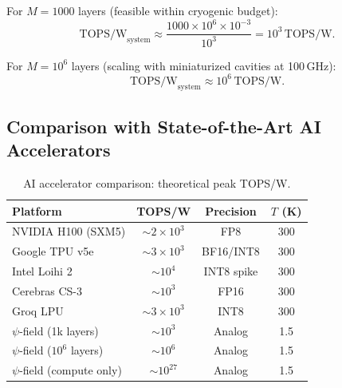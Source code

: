 \documentclass[11pt,twocolumn]{article}
\theoremstyle{definition}
\theoremstyle{remark}
\begin{document}
For $M = 1000$ layers (feasible within cryogenic budget):
\begin{equation}
\mathrm{TOPS/W}_{\mathrm{system}} \approx \frac{1000 \times 10^6 \times 10^{-3}}{10^3}
= 10^3\,\mathrm{TOPS/W}.
\end{equation}

For $M = 10^6$ layers (scaling with miniaturized cavities at 100\,GHz):
\begin{equation}
\mathrm{TOPS/W}_{\mathrm{system}} \approx 10^6\,\mathrm{TOPS/W}.
\end{equation}

\subsection{Comparison with State-of-the-Art AI Accelerators}
\label{sec:ai_comparison}

\begin{table}[h]
\centering
\caption{AI accelerator comparison: theoretical peak TOPS/W.}
\label{tab:ai_comparison}
\begin{tabular}{@{}lccc@{}}
\toprule
\textbf{Platform} & \textbf{TOPS/W} & \textbf{Precision} & \textbf{$T$ (K)} \\
\midrule
NVIDIA H100 (SXM5) & $\sim 2\times 10^3$ & FP8 & 300 \\
Google TPU v5e & $\sim 3\times 10^3$ & BF16/INT8 & 300 \\
Intel Loihi 2 & $\sim 10^4$ & INT8 spike & 300 \\
Cerebras CS-3 & $\sim 10^3$ & FP16 & 300 \\
Groq LPU & $\sim 3\times 10^3$ & INT8 & 300 \\
\midrule
$\psi$-field (1k layers) & $\sim 10^3$ & Analog & 1.5 \\
$\psi$-field ($10^6$ layers) & $\sim 10^6$ & Analog & 1.5 \\
$\psi$-field (compute only) & $\sim 10^{27}$ & Analog & 1.5 \\
\bottomrule
\end{tabular}
\end{table}
\end{document}
